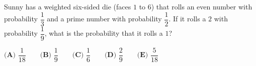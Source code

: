 Sunny has a weighted six-sided die (faces $1$ to $6$) that rolls an even number with probability $\dfrac13$ and a prime number with probability $\dfrac12$. If it rolls a $2$ with probability $\dfrac19$, what is the probability that it rolls a $1$?

$\textbf{(A) }\dfrac{1}{18}\qquad\textbf{(B) }\dfrac{1}{9}\qquad\textbf{(C) }\dfrac{1}{6}\qquad\textbf{(D) }\dfrac{2}{9}\qquad\textbf{(E) }\dfrac{5}{18}$

